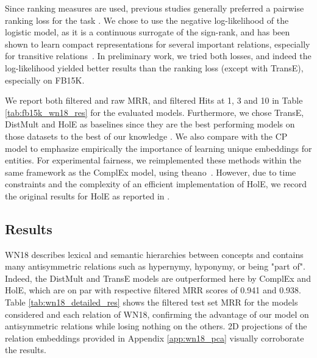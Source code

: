 \documentclass{article}
\begin{document}
Since ranking measures are used, previous studies generally preferred a pairwise ranking loss for the task \cite{bordes2013translating,nickel_2016_holographic}. We chose to use the negative log-likelihood of the logistic model, as it is a continuous surrogate of the sign-rank, and has been shown to learn compact representations for several important relations, especially for transitive relations~\cite{bouchard2015}. In preliminary work, we tried both losses, and indeed the log-likelihood yielded better results than the ranking loss (except with TransE), especially on FB15K.


We report both filtered and raw MRR, and filtered Hits at 1, 3 and 10 in Table \ref{tab:fb15k_wn18_res} for the evaluated models. Furthermore, we chose TransE, DistMult and HolE as baselines since they are the best performing models on those datasets to the best of our knowledge \cite{nickel_2016_holographic,Yang2015}. We also compare with the CP model to emphasize empirically the importance of learning unique embeddings for entities. 
For experimental fairness, we reimplemented these methods within the same framework as the ComplEx model, using theano~\cite{theano}. 
However, due to time constraints and the complexity of an efficient implementation of HolE, we record the original results for HolE as reported in \citet{nickel_2016_holographic}.



\subsection{Results}


WN18 describes lexical and semantic hierarchies between concepts and contains many antisymmetric relations such as hypernymy, hyponymy, or being "part of". Indeed, the DistMult and TransE models are outperformed here by ComplEx and HolE, which are on par with respective filtered MRR scores of 0.941 and 0.938. %
Table \ref{tab:wn18_detailed_res} shows the filtered test set MRR for the models considered and each relation of WN18, confirming the advantage of our model on antisymmetric relations while losing nothing on the others. 2D projections of the relation embeddings provided in Appendix \ref{app:wn18_pca} visually corroborate the results.
\end{document}
